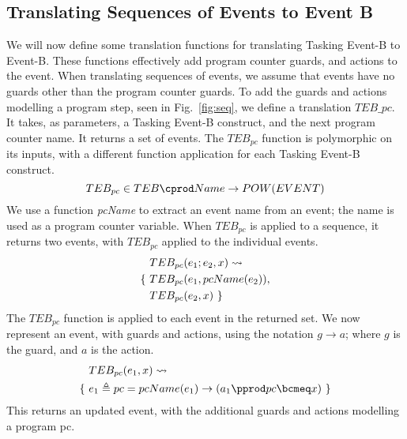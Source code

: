 \subsection{Translating Sequences of Events to Event B}
We will now define some translation functions for translating Tasking Event-B to Event-B. These functions effectively add program counter guards, and actions to the event. When translating sequences of events, we assume that events have no guards other than the program counter guards. To add the guards and actions modelling a program step, seen in Fig.~\ref{fig:seq}, we define a translation $TEB\_{pc}$. It takes, as parameters, a Tasking Event-B construct, and the next program counter name. It returns a set of events. The $TEB_{pc}$ function is polymorphic on its inputs, with a different function application for each Tasking Event-B construct.
%
\begin{equation}
TEB_{pc} \in  TEB \cprod Name \rightarrow POW(EVENT)
\notag
\end{equation}
%
We use a function \emph{pcName} to extract an event name from an event; the name is used as a program counter variable. When $TEB_{pc}$ is applied to a sequence, it returns two events, with $TEB_{pc}$ applied to the individual events. 
%
\begin{equation}
\begin{split}
&TEB_{pc}(e_1 ; e_2, x) \leadsto \\
\{~&TEB_{pc}(e_1, pcName(e_2)),\\
&TEB_{pc}(e_2, x)~\}
\end{split}
\notag
\end{equation}
%
The $TEB_{pc}$ function is applied to each event in the returned set. We now represent an event, with guards and actions, using the notation $g \rightarrow a$; where $g$ is the guard, and $a$ is the action. 
\begin{equation}
\begin{split}
&TEB_{pc}(e_1, x) \leadsto \\
\{~&e_1 \triangleq pc = pcName(e_1) \rightarrow ( a_1 \pprod pc \bcmeq x )~\}
\end{split}
\notag
\end{equation}
This returns an updated event, with the additional guards and actions modelling a program pc.

%  
